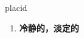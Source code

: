
\begin{frame}
{\huge placid}
\begin{center}
\begin{enumerate}\Large
  \item \textbf{冷静的，淡定的}
\end{enumerate}
\end{center}
\end{frame}
